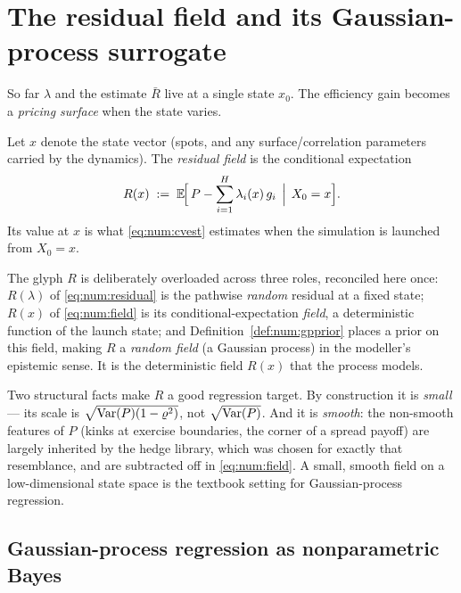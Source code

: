 \section{The residual field and its Gaussian-process surrogate}
\label{sec:num:gp}

So far $\lambda$ and the estimate $\bar R$ live at a single state $x_0$. The
efficiency gain becomes a \emph{pricing surface} when the state varies.

\begin{definition}\label{def:num:field}
Let $x$ denote the state vector (spots, and any surface/correlation parameters
carried by the dynamics). The \emph{residual field} is the conditional
expectation
\begin{equation}\label{eq:num:field}
   R(x) \;:=\; \mathbb{E}\!\Bigl[\,P - \sum_{i=1}^H \lambda_i(x)\, g_i \,\Bigm|\, X_0 = x\Bigr].
\end{equation}
Its value at $x$ is what \eqref{eq:num:cvest} estimates when the simulation is
launched from $X_0 = x$.
\end{definition}

The glyph $R$ is deliberately overloaded across three roles, reconciled here once:
$R(\lambda)$ of \eqref{eq:num:residual} is the pathwise \emph{random} residual at
a fixed state; $R(x)$ of \eqref{eq:num:field} is its conditional-expectation
\emph{field}, a deterministic function of the launch state; and
Definition~\ref{def:num:gpprior} places a prior on this field, making $R$ a
\emph{random field} (a Gaussian process) in the modeller's epistemic sense. It is
the deterministic field $R(x)$ that the process models.

Two structural facts make $R$ a good regression target. By construction it is
\emph{small} --- its scale is $\sqrt{\operatorname{Var}(P)(1-\varrho^2)}$, not
$\sqrt{\operatorname{Var}(P)}$. And it is \emph{smooth}: the non-smooth features of $P$ (kinks
at exercise boundaries, the corner of a spread payoff) are largely inherited by
the hedge library, which was chosen for exactly that resemblance, and are
subtracted off in \eqref{eq:num:field}. A small, smooth field on a
low-dimensional state space is the textbook setting for Gaussian-process
regression.

\subsection{Gaussian-process regression as nonparametric Bayes}

